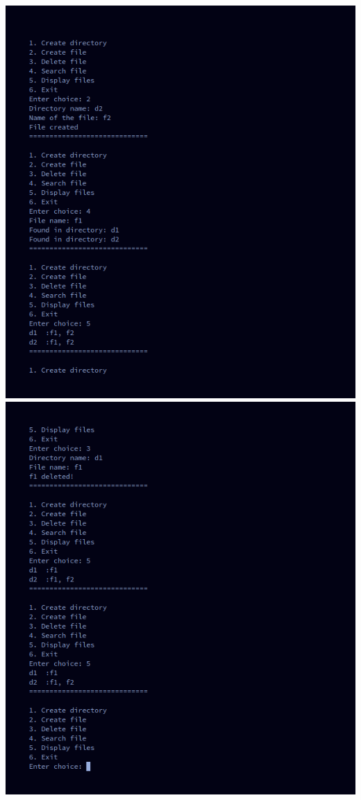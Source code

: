 \documentclass[10pt,a4paper,titlepage]{report}
\begin{document}
{\includegraphics[width=\linewidth]{../Images/file_organization/5.png}\newline
\includegraphics[width=\linewidth]{../Images/file_organization/6.png}\newline
}
\end{document}
